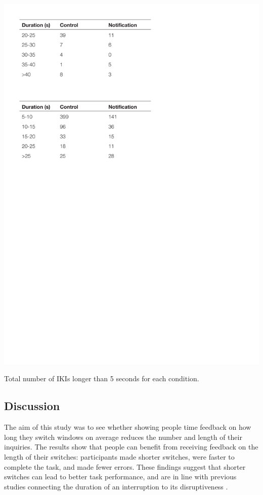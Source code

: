 \begin{table}
\centering
\centerline{\includegraphics[scale=0.8]{images/ch56/ch56_LongIKIs.pdf}}
\caption{Total number of IKIs longer than 5 seconds for each condition.}
\label{tbl:ch56-tblikis}
\end{table}

\subsection{Discussion}
The aim of this study was to see whether showing people time feedback on how long they switch windows on average reduces the number and length of their inquiries. The results show that people can benefit from receiving feedback on the length of their switches: participants made shorter switches, were faster to complete the task, and made fewer errors. These findings suggest that shorter switches can lead to better task performance, and are in line with previous studies connecting the duration of an interruption to its disruptiveness \citep{Altmann2017, Monk2008}.


